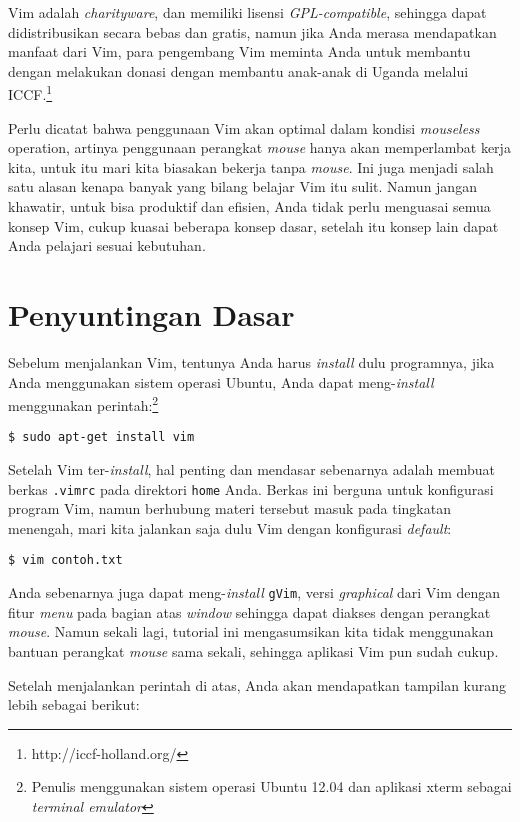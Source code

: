 \documentclass{article}
\begin{document}
Vim adalah \emph{charityware}, dan memiliki lisensi
\emph{GPL-compatible}, sehingga dapat didistribusikan secara
bebas dan gratis, namun jika Anda merasa mendapatkan manfaat
dari Vim, para pengembang Vim meminta Anda untuk membantu
dengan melakukan donasi dengan membantu anak-anak di Uganda
melalui ICCF.\footnote{http://iccf-holland.org/}

Perlu dicatat bahwa penggunaan Vim akan optimal dalam
kondisi \emph{mouseless} operation, artinya penggunaan
perangkat \emph{mouse} hanya akan memperlambat kerja kita,
untuk itu mari kita biasakan bekerja tanpa \emph{mouse}. Ini
juga menjadi salah satu alasan kenapa banyak yang bilang
belajar Vim itu sulit. Namun jangan khawatir, untuk bisa
produktif dan efisien, Anda tidak perlu menguasai semua
konsep Vim, cukup kuasai beberapa konsep dasar, setelah itu
konsep lain dapat Anda pelajari sesuai kebutuhan.

\section{Penyuntingan Dasar}

Sebelum menjalankan Vim, tentunya Anda harus \emph{install}
dulu programnya, jika Anda menggunakan sistem operasi
Ubuntu, Anda dapat meng-\emph{install} menggunakan
perintah:\footnote{Penulis menggunakan sistem operasi Ubuntu
12.04 dan aplikasi xterm sebagai \emph{terminal emulator}}

\begin{verbatim}
$ sudo apt-get install vim
\end{verbatim}

Setelah Vim ter-\emph{install}, hal penting dan mendasar
sebenarnya adalah membuat berkas \verb=.vimrc= pada
direktori \verb=home= Anda. Berkas ini berguna untuk
konfigurasi program Vim, namun berhubung materi tersebut
masuk pada tingkatan menengah, mari kita jalankan saja dulu
Vim dengan konfigurasi \emph{default}:

\begin{verbatim}
$ vim contoh.txt
\end{verbatim}

Anda sebenarnya juga dapat meng-\emph{install} \verb=gVim=,
versi \emph{graphical} dari Vim dengan fitur \emph{menu}
pada bagian atas \emph{window} sehingga dapat diakses dengan
perangkat \emph{mouse}.  Namun sekali lagi, tutorial ini
mengasumsikan kita tidak menggunakan bantuan perangkat
\emph{mouse} sama sekali, sehingga aplikasi Vim pun sudah
cukup.

Setelah menjalankan perintah di atas, Anda akan mendapatkan
tampilan kurang lebih sebagai berikut:
\end{document}
